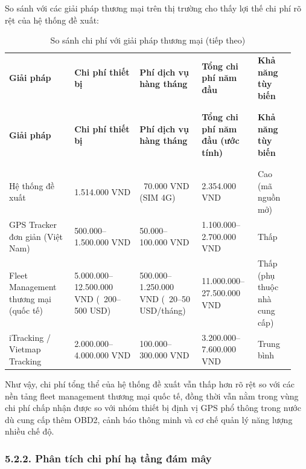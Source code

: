 \documentclass[a4paper]{extarticle}
\newcommand{\thesissettableid}[2]{%
  \renewcommand{\thetable}{#1}%
  \renewcommand{\theHtable}{#2}%
}
\begin{document}
So sánh với các giải pháp thương mại trên thị trường cho thấy lợi thế
chi phí rõ rệt của hệ thống đề xuất:


{\thesissettableid{5.5}{tab-ch5-so-sanh-chi-phi-voi-giai-phap-thuong-mai}
\def\LTcaptype{table}
\begin{longtable}{|L{0.215\linewidth}|L{0.213\linewidth}|L{0.205\linewidth}|L{0.183\linewidth}|L{0.129\linewidth}|}
\caption{So sánh chi phí với giải pháp thương mại}\label{tab:ch5-so-sanh-chi-phi-voi-giai-phap-thuong-mai}\\
\hline \textbf{Giải pháp} & \textbf{Chi phí thiết bị} & \textbf{Phí dịch vụ hàng tháng} & \textbf{Tổng chi phí năm
đầu} & \textbf{Khả năng tùy biến} \\
\\\hline
\endfirsthead
\caption[]{So sánh chi phí với giải pháp thương mại (tiếp theo)}\\
\hline \textbf{Giải pháp} & \textbf{Chi phí thiết bị} & \textbf{Phí dịch vụ hàng tháng} & \textbf{Tổng chi phí năm
đầu (ước tính)} & \textbf{Khả năng tùy biến} \\
\\\hline
\endhead
\\\hline
\endfoot
\endlastfoot
Hệ thống đề xuất & 1.514.000 VND & ~70.000 VND
(SIM 4G) & 2.354.000 VND & Cao (mã nguồn mở) \\\hline
GPS Tracker đơn giản (Việt Nam) & 500.000--1.500.000 VND &
50.000--100.000 VND & 1.100.000--2.700.000 VND & Thấp \\\hline
Fleet Management thương mại (quốc tế) & 5.000.000--12.500.000 VND
(~200--500 USD) & 500.000--1.250.000 VND
(~20--50 USD/tháng) & 11.000.000--27.500.000 VND & Thấp
(phụ thuộc nhà cung cấp) \\\hline
iTracking / Vietmap Tracking & 2.000.000--4.000.000 VND &
100.000--300.000 VND & 3.200.000--7.600.000 VND & Trung bình \\\hline
\end{longtable}
}


Như vậy, chi phí tổng thể của hệ thống đề xuất vẫn thấp hơn rõ rệt so
với các nền tảng fleet management thương mại quốc tế, đồng thời vẫn nằm
trong vùng chi phí chấp nhận được so với nhóm thiết bị định vị GPS phổ thông
trong nước dù cung cấp thêm OBD2, cảnh báo thông minh và cơ chế quản lý
năng lượng nhiều chế độ.

\subsubsection{5.2.2. Phân tích chi phí hạ tầng đám
mây}\label{522-phuxe2n-tuxedch-chi-phuxed-hux1ea1-tux1ea7ng-ux111uxe1m-muxe2y}
\end{document}
